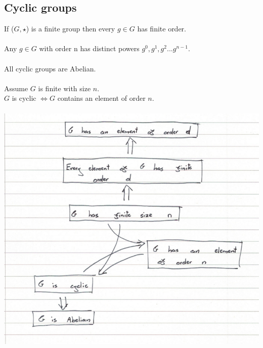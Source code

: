 \documentclass{article}
\begin{document}
\subsection{Cyclic groups}
If ($ G, \star $) is a finite group then every $ g \in G $ has finite order.
\\\\
Any $ g \in G $ with order n has distinct powers $ g^{0}, g^{1}, g^{2}...g^{n - 1} $.
\\\\
All cyclic groups are Abelian.
\\\\
Assume $ G $ is finite with size $ n $. \\
$ G $ is cyclic $ \Leftrightarrow G $ contains an element of order $ n $.
\\\\
\includegraphics[scale=0.4]{cyclic_groups}
\end{document}
